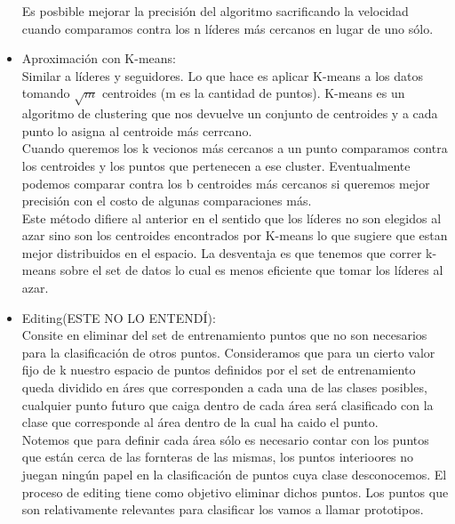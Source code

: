 \documentclass[titlepage,a4paper]{article}
\begin{document}
\begin{itemize}
Es posbible mejorar la precisión del algoritmo sacrificando la velocidad cuando comparamos contra los n líderes más cercanos en lugar de uno sólo. \\

\item Aproximación con K-means: \\

Similar a líderes y seguidores. Lo que hace es aplicar K-means a los datos tomando $\sqrt{m}$ centroides (m es la cantidad de puntos). K-means es un algoritmo de clustering que nos devuelve un conjunto de centroides y a cada punto lo asigna al centroide más cerrcano. \\

Cuando queremos los k vecionos más cercanos a un punto comparamos contra los centroides y los puntos que pertenecen a ese cluster. Eventualmente podemos comparar contra los b centroides más cercanos si queremos mejor precisión con el costo de algunas comparaciones más.  \\

Este método difiere al anterior en el sentido que los líderes no son elegidos al azar sino son los centroides encontrados por K-means lo que sugiere que estan mejor distribuidos en el espacio. La desventaja es que tenemos que correr k-means sobre el set de datos lo cual es menos eficiente que tomar los líderes al azar. 

\item Editing(ESTE NO LO ENTENDÍ): \\

Consite en eliminar del set de entrenamiento puntos que no son necesarios  para la clasificación de otros puntos. Consideramos que para un cierto valor fijo de k nuestro espacio de puntos definidos por el set de entrenamiento queda dividido en áres que corresponden a cada una de las clases posibles, cualquier punto futuro que caiga dentro de cada área será clasificado con la clase que corresponde al área dentro de la cual ha caido el punto. \\

Notemos que para definir cada área sólo es necesario contar con los puntos que están cerca de las fornteras de las mismas, los puntos interioores no juegan ningún papel en la clasificación de puntos cuya clase desconocemos. El proceso de editing tiene como objetivo eliminar dichos puntos. Los puntos que son relativamente relevantes para clasificar los vamos a llamar prototipos. \\


\end{itemize}
\end{document}
